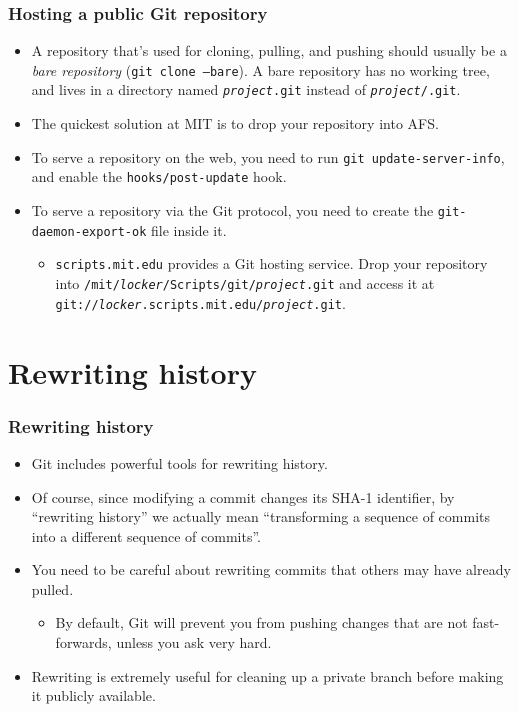 \documentclass{beamer}
\begin{document}
\begin{frame}
  \frametitle{Hosting a public Git repository}

  \begin{itemize}
  \item A repository that's used for cloning, pulling, and pushing
    should usually be a \emph{bare repository} (\texttt{git clone
      --bare}).  A bare repository has no working tree, and lives in a
    directory named \texttt{\textit{project}.git} instead of
    \texttt{\textit{project}/.git}.
  \item The quickest solution at MIT is to drop your repository into
    AFS.
  \item To serve a repository on the web, you need to run \texttt{git
      update-server-info}, and enable the \texttt{hooks/post-update}
    hook.
  \item To serve a repository via the Git protocol, you need to create
    the \texttt{git-daemon-export-ok} file inside it.
    \begin{itemize}
    \item \texttt{scripts.mit.edu} provides a Git hosting service.
      Drop your repository into
      \texttt{/mit/\textit{locker}/Scripts/git/\textit{project}.git}
      and access it at
      \texttt{git://\textit{locker}.scripts.mit.edu/\textit{project}.git}.
    \end{itemize}
  \end{itemize}
\end{frame}

\section{Rewriting history}

\begin{frame}
  \frametitle{Rewriting history}

  \begin{itemize}
  \item Git includes powerful tools for rewriting history.
  \item Of course, since modifying a commit changes its SHA-1
    identifier, by ``rewriting history'' we actually mean
    ``transforming a sequence of commits into a different sequence of
    commits''.
  \item You need to be careful about rewriting commits that others may
    have already pulled.
    \begin{itemize}
    \item By default, Git will prevent you from pushing changes that
      are not fast-forwards, unless you ask very hard.
    \end{itemize}
  \item Rewriting is extremely useful for cleaning up a private branch
    before making it publicly available.
  \end{itemize}
\end{frame}
\end{document}
